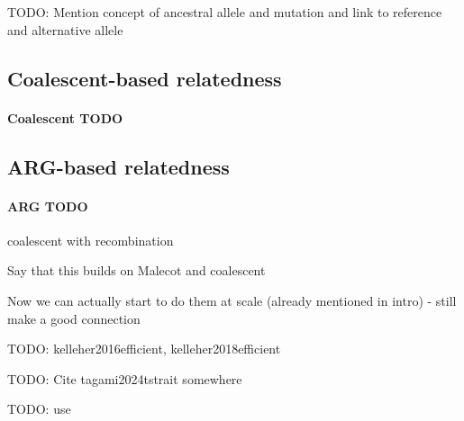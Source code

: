 
%

TODO: Mention concept of ancestral allele and mutation and link to reference and
      alternative allele


\subsection{Coalescent-based relatedness}

\paragraph{Coalescent TODO}

\cite{kingman1982on}
\cite{kingman1982the}
\cite{hein2004gene}


\subsection{ARG-based relatedness}

\paragraph{ARG TODO}

coalescent with recombination

Say that this builds on Malecot and coalescent

Now we can actually start to do them at scale (already mentioned in intro) - still make a good connection


TODO: kelleher2016efficient, kelleher2018efficient

TODO: Cite tagami2024tstrait somewhere

TODO: use \cite{speidel2019method}

